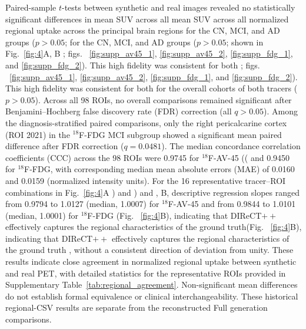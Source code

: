 \documentclass{article}
\providecommand{\DIFaddtex}[1]{{\protect\color{blue} \sf #1}} %
\providecommand{\DIFdeltex}[1]{{\protect\color{red} \ifmmode #1\else\scriptsize #1\fi}} %
\providecommand{\DIFaddbegin}{} %
\providecommand{\DIFaddend}{} %
\providecommand{\DIFdelbegin}{} %
\providecommand{\DIFdelend}{} %
\providecommand{\DIFadd}[1]{\texorpdfstring{\DIFaddtex{#1}}{#1}} %
\providecommand{\DIFdel}[1]{\texorpdfstring{\DIFdeltex{#1}}{}} %
\newcommand{\DIFscaledelfig}{0.5}
\newlength{\DIFdelgraphicswidth} %
\newlength{\DIFdelgraphicsheight} %
\newcommand{\DIFaddincludegraphics}[2][]{{\color{blue}\fbox{\DIFOincludegraphics[#1]{#2}}}} %
\newcommand{\DIFdelincludegraphics}[2][]{%
\sbox{\DIFdelgraphicsbox}{\DIFOincludegraphics[#1]{#2}}%
\settoboxwidth{\DIFdelgraphicswidth}{\DIFdelgraphicsbox} %
\settoboxtotalheight{\DIFdelgraphicsheight}{\DIFdelgraphicsbox} %
\scalebox{\DIFscaledelfig}{%
\parbox[b]{\DIFdelgraphicswidth}{\usebox{\DIFdelgraphicsbox}\\[-\baselineskip] \rule{\DIFdelgraphicswidth}{0em}}\llap{\resizebox{\DIFdelgraphicswidth}{\DIFdelgraphicsheight}{%
\setlength{\unitlength}{\DIFdelgraphicswidth}%
\begin{picture}(1,1)%
\thicklines\linethickness{2pt} %
{\color[rgb]{1,0,0}\put(0,0){\framebox(1,1){}}}%
{\color[rgb]{1,0,0}\put(0,0){\line( 1,1){1}}}%
{\color[rgb]{1,0,0}\put(0,1){\line(1,-1){1}}}%
\end{picture}%
}\hspace*{3pt}}} %
} %
\DeclareRobustCommand{\DIFaddbegin}{\DIFOaddbegin \let\includegraphics\DIFaddincludegraphics} %
\DeclareRobustCommand{\DIFaddend}{\DIFOaddend \let\includegraphics\DIFOincludegraphics} %
\DeclareRobustCommand{\DIFdelbegin}{\DIFOdelbegin \let\includegraphics\DIFdelincludegraphics} %
\DeclareRobustCommand{\DIFdelend}{\DIFOaddend \let\includegraphics\DIFOincludegraphics} %
\begin{document}
Paired-sample $t$-tests between synthetic and real images revealed no statistically significant differences in \DIFdelbegin \DIFdel{mean SUV across all }\DIFdelend \DIFaddbegin \DIFadd{normalized regional uptake across the }\DIFaddend principal brain regions \DIFdelbegin \DIFdel{for the CN, MCI, and AD groups ($p>0.05$; }\DIFdelend \DIFaddbegin \DIFadd{shown in }\DIFaddend Fig.~\ref{fig:4}A, B \DIFdelbegin \DIFdel{; figs. ~\ref{fig:supp_av45_1}, \ref{fig:supp_av45_2}, \ref{fig:supp_fdg_1}, and \ref{fig:supp_fdg_2}). This high fidelity was consistent for both }\DIFdelend \DIFaddbegin \DIFadd{for the overall cohorts of both tracers ($p>0.05$). Across all 98 ROIs, no overall comparisons remained significant after Benjamini--Hochberg false discovery rate (FDR) correction (all $q>0.05$). Among the diagnosis-stratified paired comparisons, only the right pericalcarine cortex (ROI 2021) in the $^{18}$F-FDG MCI subgroup showed a significant mean paired difference after FDR correction ($q=0.0481$). The median concordance correlation coefficients (CCC) across the 98 ROIs were 0.9745 for }\DIFaddend $^{18}$F-AV-45 \DIFdelbegin \DIFdel{(}\DIFdelend \DIFaddbegin \DIFadd{and 0.9450 for $^{18}$F-FDG, with corresponding median mean absolute errors (MAE) of 0.0160 and 0.0159 (normalized intensity units). For the 16 representative tracer--ROI combinations in }\DIFaddend Fig.~\ref{fig:4}A\DIFdelbegin \DIFdel{) and }\DIFdelend \DIFaddbegin \DIFadd{, B, descriptive regression slopes ranged from 0.9794 to 1.0127 (median, 1.0007) for $^{18}$F-AV-45 and from 0.9844 to 1.0101 (median, 1.0001) for }\DIFaddend $^{18}$F-FDG\DIFdelbegin \DIFdel{(Fig. ~\ref{fig:4}B), indicating that DIReCT$++$ effectively captures the regional characteristics of the ground truth}\DIFdelend \DIFaddbegin \DIFadd{, without a consistent direction of deviation from unity. These results indicate close agreement in normalized regional uptake between synthetic and real PET, with detailed statistics for the representative ROIs provided in Supplementary Table~\ref{tab:regional_agreement}. Non-significant mean differences do not establish formal equivalence or clinical interchangeability. These historical regional-CSV results are separate from the reconstructed Full generation comparisons}\DIFaddend .
\end{document}
